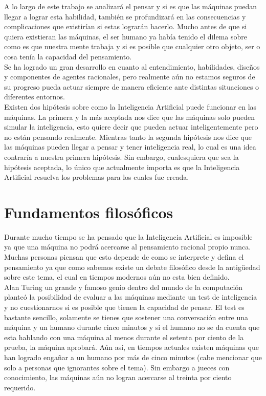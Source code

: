 \documentclass[12pt]{article}
\begin{document}
A lo largo de este trabajo se analizará el pensar y si es que las máquinas puedan llegar a lograr esta habilidad, también se profundizará en las consecuencias y complicaciones que existirían si estas lograrán hacerlo. Mucho antes de que si quiera existieran las máquinas, el ser humano ya había tenido el dilema sobre como es que nuestra mente trabaja y si es posible que cualquier otro objeto, ser o cosa tenía la capacidad del pensamiento.\\

Se ha logrado un gran desarrollo en cuanto al entendimiento, habilidades, diseños y componentes de agentes racionales, pero realmente aún no estamos seguros de su progreso pueda actuar siempre de manera eficiente ante distintas situaciones o diferentes entornos.\\

Existen dos hipótesis sobre como la Inteligencia Artificial puede funcionar en las máquinas. La primera y la más aceptada nos dice que las máquinas solo pueden simular la inteligencia, esto quiere decir que pueden actuar inteligentemente pero no están pensando realmente. Mientras tanto la segunda hipótesis nos dice que las máquinas pueden llegar a pensar y tener inteligencia real, lo cual es una idea contraría a nuestra primera hipótesis.
Sin embargo, cualesquiera que sea la hipótesis aceptada, lo único que actualmente importa es que la Inteligencia Artificial resuelva los problemas para los cuales fue creada.

\section{Fundamentos filosóficos}

Durante mucho tiempo se ha pensado que la Inteligencia Artificial es imposible ya que una máquina no podrá acercarse al pensamiento racional propio nunca. Muchas personas piensan que esto depende de como se interprete y defina el pensamiento ya que como sabemos existe un debate filosófico desde la antigüedad sobre este tema, el cual en tiempos modernos aún no esta bien definido.\\

Alan Turing un grande y famoso genio dentro del mundo de la computación planteó la posibilidad de evaluar a las máquinas mediante un test de inteligencia y no cuestionarnos si es posible que tienen la capacidad de pensar. El test es bastante sencillo, solamente se tienes que sostener una conversación entre una máquina y un humano durante cinco minutos y si el humano no se da cuenta que esta hablando con una máquina al menos durante el setenta por ciento de la prueba, la máquina aprobará.
Aún así, en tiempos actuales existen máquinas que han logrado engañar a un humano por más de cinco minutos (cabe mencionar que solo a personas que ignorantes sobre el tema). Sin embargo a jueces con conocimiento, las máquinas aún no logran acercarse al treinta por ciento requerido.\\
\end{document}
